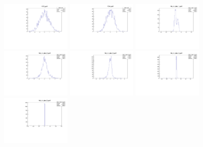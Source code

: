 \begin{figure}[tb]
\begin{center}
	\includegraphics[width=0.3\textwidth]{figs/DataPulls/DG_pull.pdf}
	\includegraphics[width=0.3\textwidth]{figs/DataPulls/Dm_pull.pdf}
	\includegraphics[width=0.3\textwidth]{figs/DataPulls/ds_m_dpe_1_pull.pdf}
	\includegraphics[width=0.3\textwidth]{figs/DataPulls/ds_m_dpe_2_pull.pdf}
	\includegraphics[width=0.3\textwidth]{figs/DataPulls/ds_m_dpe_3_pull.pdf}
	\includegraphics[width=0.3\textwidth]{figs/DataPulls/ds_m_dpe_4_pull.pdf}
	\includegraphics[width=0.3\textwidth]{figs/DataPulls/ds_m_dpe_5_pull.pdf}

\end{center}
\end{figure}
